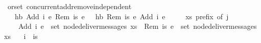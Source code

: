 \begin{isabellebody}
\isamarkupfalse%
\ {\isacharparenleft}\ orset{\isacharparenright}\ concurrent{\isacharunderscore}add{\isacharunderscore}remove{\isacharunderscore}independent{\isacharcolon}\isanewline
\ \ \ {\isachardoublequoteopen}{\isasymnot}\ hb\ {\isacharparenleft}Add\ i\ e{}{\isacharparenright}\ {\isacharparenleft}Rem\ is\ e{}{\isacharparenright}{\isachardoublequoteclose}\ \ {\isachardoublequoteopen}{\isasymnot}\ hb\ {\isacharparenleft}Rem\ is\ e{}{\isacharparenright}\ {\isacharparenleft}Add\ i\ e{}{\isacharparenright}{\isachardoublequoteclose}\isanewline
\ \ \ \ \ {\isachardoublequoteopen}xs\ prefix\ of\ j{\isachardoublequoteclose}\isanewline
\ \ \ \ \ {\isachardoublequoteopen}Add\ i\ e{}\ {\isasymin}\ set\ {\isacharparenleft}node{\isacharunderscore}deliver{\isacharunderscore}messages\ xs{\isacharparenright}{\isachardoublequoteclose}\ \ {\isachardoublequoteopen}Rem\ is\ e{}\ {\isasymin}\ set\ {\isacharparenleft}node{\isacharunderscore}deliver{\isacharunderscore}messages\ xs{\isacharparenright}{\isachardoublequoteclose}\isanewline
\ \ \ {\isachardoublequoteopen}i\ {\isasymnotin}\ is{\isachardoublequoteclose}\isanewline
\end{isabellebody}


